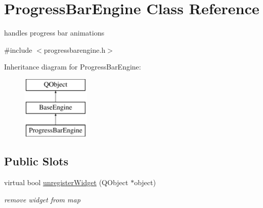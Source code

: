 \hypertarget{class_progress_bar_engine}{}\section{Progress\+Bar\+Engine Class Reference}
\label{class_progress_bar_engine}


handles progress bar animations  




{\ttfamily \#include $<$progressbarengine.\+h$>$}

Inheritance diagram for Progress\+Bar\+Engine\+:\begin{figure}[H]
\begin{center}
\leavevmode
\includegraphics[height=3.000000cm]{class_progress_bar_engine}
\end{center}
\end{figure}
\subsection*{Public Slots}
\begin{DoxyCompactItemize}
\item 
\mbox{\label{class_progress_bar_engine_a67d534cad559dd63f1440e9eea7f1acb}} 
virtual bool \hyperlink{class_progress_bar_engine_a67d534cad559dd63f1440e9eea7f1acb}{unregister\+Widget} (Q\+Object $\ast$object)
\begin{DoxyCompactList}\small\item\em remove widget from map \end{DoxyCompactList}\end{DoxyCompactItemize}
